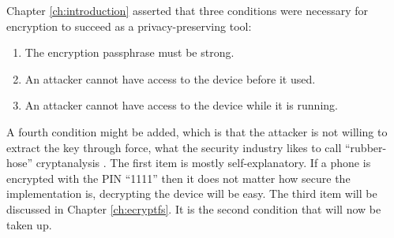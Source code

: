 \begin{samepage}
Chapter \ref{ch:introduction} asserted that three conditions were necessary for encryption to succeed as a privacy-preserving tool:

\begin{enumerate}
	\item{The encryption passphrase must be strong.}
	\item{An attacker cannot have access to the device before it used.}
	\item{An attacker cannot have access to the device while it is running.}
\end{enumerate}
\end{samepage}
A fourth condition might be added, which is that the attacker is not willing to extract the key through force, what the security
industry likes to call ``rubber-hose'' cryptanalysis \cite{rubberhose}.  The first item is mostly self-explanatory. If a phone is
encrypted with the PIN ``1111'' then it does not matter how secure the implementation is, decrypting the device will be easy. The
third item will be discussed in Chapter \ref{ch:ecryptfs}.  It is the second condition that will now be taken up. 

